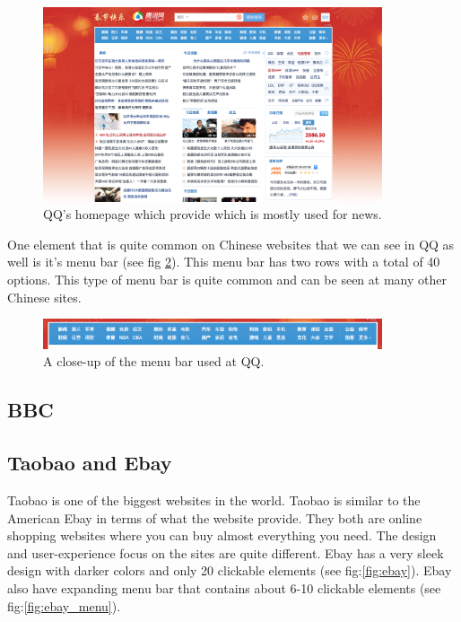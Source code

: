 \begin{figure}[h]
\centering
\includegraphics[width=100mm]{Images/QQ.png}
\decoRule
\caption[QQ.com]{QQ's homepage which provide which is mostly used for news.}
\label{fig:QQ.com}
\end{figure}

One element that is quite common on Chinese websites that we can see in QQ as well is it's menu bar (see fig \ref{fig:QQ_menubar}). This menu bar has two rows with a total of 40 options. This type of menu bar is quite common and can be seen at many other Chinese sites.


\begin{figure}[h]
\centering
\includegraphics[width=100mm]{Images/QQ_menubar.png}
\decoRule
\caption[QQ's Menu bar]{A close-up of the menu bar used at QQ.}
\label{fig:QQ_menubar}
\end{figure}

\subsection{BBC}

\subsection{Taobao and Ebay}
Taobao is one of the biggest websites in the world. Taobao is similar to the American Ebay in terms of what the website provide. They both are online shopping websites where you can buy almost everything you need. The design and user-experience focus on the sites are quite different. Ebay has a very sleek design with darker colors and only 20 clickable elements (see fig:\ref{fig:ebay}). Ebay also have expanding menu bar that contains about 6-10 clickable elements (see fig:\ref{fig:ebay_menu}).

